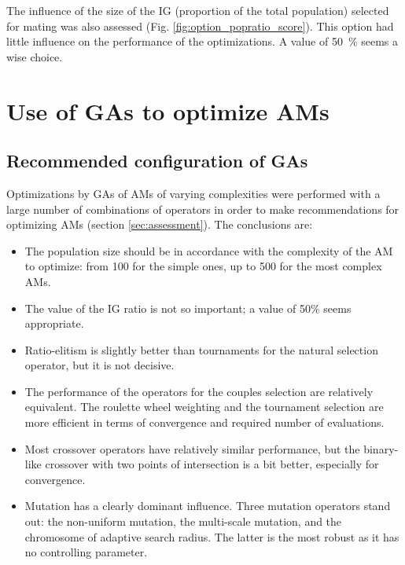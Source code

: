 \documentclass{ametsoc}
\begin{document}
The influence of the size of the IG (proportion of the total population) selected for mating was also assessed (Fig. \ref{fig:option_popratio_score}). This option had little influence on the performance of the optimizations. A value of 50~\% seems a wise choice.


\section{Use of GAs to optimize AMs}
\label{sec:use}

\subsection{Recommended configuration of GAs}
\label{sec:recommendations}

Optimizations by GAs of AMs of varying complexities were performed with a large number of combinations of operators in order to make recommendations for optimizing AMs (section \ref{sec:assessment}). The conclusions are:

\begin{itemize}
	\item The population size should be in accordance with the complexity of the AM to optimize: from 100 for the simple ones, up to 500 for the most complex AMs.
	
	\item The value of the IG ratio is not so important; a value of 50\% seems appropriate.
	
	\item Ratio-elitism is slightly better than tournaments for the natural selection operator, but it is not decisive.
	
	\item The performance of the operators for the couples selection are relatively equivalent. The roulette wheel weighting and the tournament selection are more efficient in terms of convergence and required number of evaluations.
	
	\item Most crossover operators have relatively similar performance, but the binary-like crossover with two points of intersection is a bit better, especially for convergence.
	
	\item Mutation has a clearly dominant influence. Three mutation operators stand out: the non-uniform mutation, the multi-scale mutation, and the chromosome of adaptive search radius. The latter is the most robust as it has no controlling parameter.
	
\end{itemize}
\end{document}
